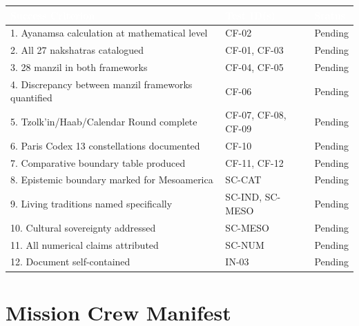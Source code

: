 \documentclass[11pt,letterpaper]{article}
\newcommand{\tableheader}[1]{\textbf{\sffamily\textcolor{white}{#1}}}
\begin{document}
\begin{center}
\begin{tabularx}{\textwidth}{XL{3.5cm}C{1.5cm}}
\toprule
{}
\tableheader{Success Criterion} & \tableheader{Test ID(s)} & \tableheader{Status} \\
. Ayanamsa calculation at mathematical level & CF-02 & Pending \\
2. All 27 nakshatras catalogued & CF-01, CF-03 & Pending \\
3. 28 manzil in both frameworks & CF-04, CF-05 & Pending \\
4. Discrepancy between manzil frameworks quantified & CF-06 & Pending \\
5. Tzolk'in/Haab/Calendar Round complete & CF-07, CF-08, CF-09 & Pending \\
6. Paris Codex 13 constellations documented & CF-10 & Pending \\
7. Comparative boundary table produced & CF-11, CF-12 & Pending \\
8. Epistemic boundary marked for Mesoamerica & SC-CAT & Pending \\
9. Living traditions named specifically & SC-IND, SC-MESO & Pending \\
10. Cultural sovereignty addressed & SC-MESO & Pending \\
11. All numerical claims attributed & SC-NUM & Pending \\
12. Document self-contained & IN-03 & Pending \\
\bottomrule
\end{tabularx}
\end{center}

\section{Mission Crew Manifest}
\end{document}
